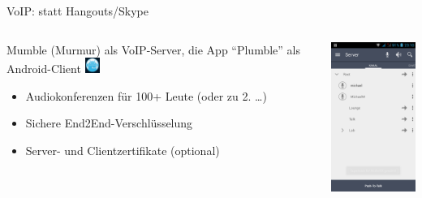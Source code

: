 \documentclass{beamer}
\begin{document}
\begin{frame}{VoIP: statt Hangouts/Skype}

\begin{columns}[c]
  \begin{column}[T]{.7\textwidth}
  
    Mumble (Murmur) als VoIP-Server, die App "`Plumble"' als Android-Client \includegraphics[width=0.5cm]{plumblei.png}

    \begin{itemize}
      \item Audiokonferenzen für 100+ Leute (oder zu 2. \dots)
      \item Sichere End2End-Verschlüsselung
      \item Server- und Clientzertifikate (optional)
    \end{itemize}

    
  \end{column}
  \begin{column}[T]{.3\textwidth}
    \includegraphics[width=3.5cm]{plumble.png} 
   \end{column}
\end{columns}

\end{frame}
\end{document}
